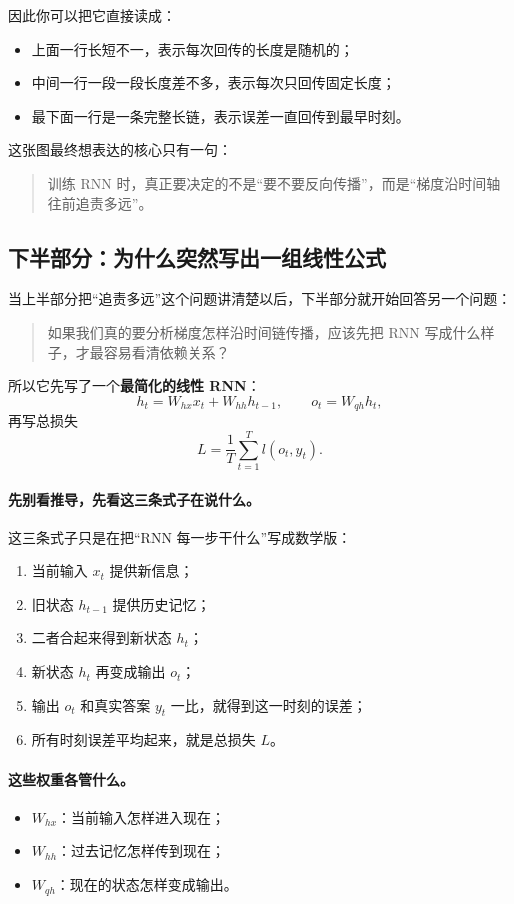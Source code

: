 \documentclass[12pt,a4paper]{ctexart}
\begin{document}
因此你可以把它直接读成：
\begin{itemize}
  \item 上面一行长短不一，表示每次回传的长度是随机的；
  \item 中间一行一段一段长度差不多，表示每次只回传固定长度；
  \item 最下面一行是一条完整长链，表示误差一直回传到最早时刻。
\end{itemize}

这张图最终想表达的核心只有一句：
\begin{quote}
训练 RNN 时，真正要决定的不是“要不要反向传播”，而是“梯度沿时间轴往前追责多远”。
\end{quote}

\subsection{下半部分：为什么突然写出一组线性公式}

当上半部分把“追责多远”这个问题讲清楚以后，下半部分就开始回答另一个问题：
\begin{quote}
如果我们真的要分析梯度怎样沿时间链传播，应该先把 RNN 写成什么样子，才最容易看清依赖关系？
\end{quote}

所以它先写了一个\textbf{最简化的线性 RNN}：
\[
h_t = W_{hx}x_t + W_{hh}h_{t-1}, \qquad
o_t = W_{qh}h_t,
\]
再写总损失
\[
L = \frac{1}{T}\sum_{t=1}^{T} l(o_t, y_t).
\]

\paragraph{先别看推导，先看这三条式子在说什么。}
这三条式子只是在把“RNN 每一步干什么”写成数学版：
\begin{enumerate}
  \item 当前输入 \(x_t\) 提供新信息；
  \item 旧状态 \(h_{t-1}\) 提供历史记忆；
  \item 二者合起来得到新状态 \(h_t\)；
  \item 新状态 \(h_t\) 再变成输出 \(o_t\)；
  \item 输出 \(o_t\) 和真实答案 \(y_t\) 一比，就得到这一时刻的误差；
  \item 所有时刻误差平均起来，就是总损失 \(L\)。
\end{enumerate}

\paragraph{这些权重各管什么。}
\begin{itemize}
  \item \(W_{hx}\)：当前输入怎样进入现在；
  \item \(W_{hh}\)：过去记忆怎样传到现在；
  \item \(W_{qh}\)：现在的状态怎样变成输出。
\end{itemize}
\end{document}
